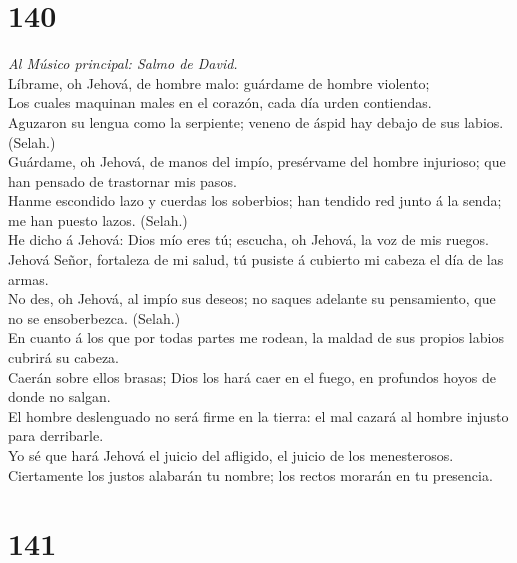 \hypertarget{section-139}{%
\section{140}\label{section-139}}

 \emph{Al Músico principal: Salmo de David.}\\
Líbrame, oh Jehová, de hombre malo: guárdame de hombre violento;\\
 Los cuales maquinan males en el corazón, cada día urden
contiendas.\\
 Aguzaron su lengua como la serpiente; veneno de áspid hay
debajo de sus labios. (Selah.)\\
 Guárdame, oh Jehová, de manos del impío, presérvame del
hombre injurioso; que han pensado de trastornar mis pasos.\\
 Hanme escondido lazo y cuerdas los soberbios; han tendido
red junto á la senda; me han puesto lazos. (Selah.)\\
 He dicho á Jehová: Dios mío eres tú; escucha, oh Jehová, la
voz de mis ruegos.\\
 Jehová Señor, fortaleza de mi salud, tú pusiste á cubierto
mi cabeza el día de las armas.\\
 No des, oh Jehová, al impío sus deseos; no saques adelante
su pensamiento, que no se ensoberbezca. (Selah.)\\
 En cuanto á los que por todas partes me rodean, la maldad
de sus propios labios cubrirá su cabeza.\\
 Caerán sobre ellos brasas; Dios los hará caer en el fuego,
en profundos hoyos de donde no salgan.\\
 El hombre deslenguado no será firme en la tierra: el mal
cazará al hombre injusto para derribarle.\\
 Yo sé que hará Jehová el juicio del afligido, el juicio de
los menesterosos.\\
 Ciertamente los justos alabarán tu nombre; los rectos
morarán en tu presencia.

\hypertarget{section-140}{%
\section{141}\label{section-140}}

